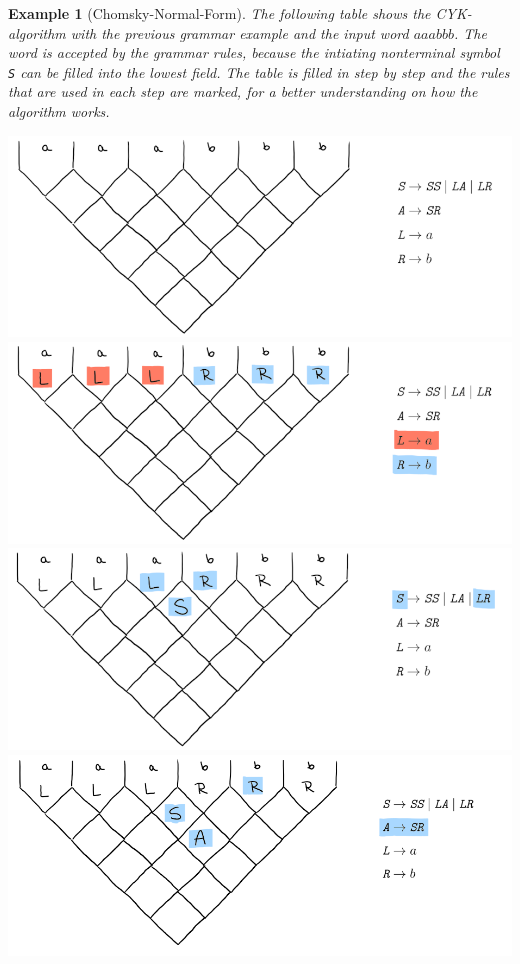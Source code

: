 \documentclass[a4paper, 11pt]{article}
\newtheorem*{example*}{Example}
\begin{document}
\begin{example*}[Chomsky-Normal-Form]
The following table shows the CYK-algorithm with the previous grammar example and the input word $aaabbb$. 
The word is accepted by the grammar rules, because the intiating nonterminal symbol \textit{\texttt{S}} can be filled into the lowest field. The table is filled in step by step and the rules that are used in each step are marked, for a better understanding on how the algorithm works. \cite{cyk_online_alg}
\ \\

\begin{center}
\includegraphics[scale=0.9]{images/7.png} \\
\includegraphics[scale=0.9]{images/6.png} \\
\includegraphics[scale=0.9]{images/5.png} \\
\includegraphics[scale=0.9]{images/4.png} \\

\end{center}
\end{example*}
\end{document}
